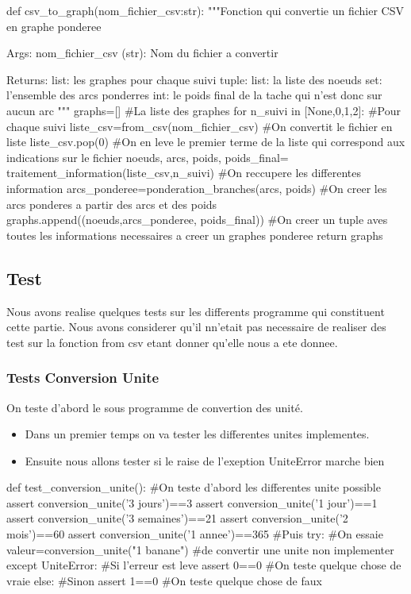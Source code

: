 \documentclass{article}
\begin{document}
\begin{python}
def csv_to_graph(nom_fichier_csv:str):
    """Fonction qui convertie un fichier CSV en graphe ponderee

    Args:
        nom_fichier_csv (str): Nom du fichier a convertir

    Returns:
        list: les graphes pour chaque suivi
            tuple:
                list: la liste des noeuds
                set: l'ensemble des arcs ponderres
                int: le poids final de la tache qui n'est donc sur aucun arc
    """
    graphs=[] #La liste des graphes
    for n_suivi in [None,0,1,2]: #Pour chaque suivi
        liste_csv=from_csv(nom_fichier_csv) #On convertit le fichier en liste
        liste_csv.pop(0) #On en leve le premier terme de la liste qui correspond aux indications sur le fichier
        noeuds, arcs, poids, poids_final= traitement_information(liste_csv,n_suivi) #On reccupere les differentes information
        arcs_ponderee=ponderation_branches(arcs, poids) #On creer les arcs ponderes a partir des arcs et des poids
        graphs.append((noeuds,arcs_ponderee, poids_final))  #On creer un tuple aves toutes les informations necessaires a creer un graphes ponderee 
    return graphs

\end{python}


\subsection{Test}
Nous avons realise quelques tests sur les differents programme qui constituent cette partie. Nous avons considerer qu'il nn'etait pas necessaire de realiser des test sur la fonction from csv etant donner qu'elle nous a ete donnee.

\subsubsection{Tests Conversion Unite}
On teste d'abord le sous programme de convertion des unité.
\begin{itemize}
    \item Dans un premier temps on va tester les differentes unites implementes.
    \item  Ensuite nous allons tester si le raise de l'exeption UniteError marche bien
\end{itemize}
\begin{python}
def test_conversion_unite():
    #On teste d'abord les differentes unite possible
    assert conversion_unite('3 jours')==3
    assert conversion_unite('1 jour')==1
    assert conversion_unite('3 semaines')==21
    assert conversion_unite('2 mois')==60
    assert conversion_unite('1 annee')==365
    #Puis
    try: #On essaie 
        valeur=conversion_unite("1 banane") #de convertir une unite non implementer
    except UniteError: #Si l'erreur est leve
        assert 0==0 #On teste quelque chose de vraie
    else: #Sinon 
        assert 1==0 #On teste quelque chose de faux
\end{python}
\end{document}
